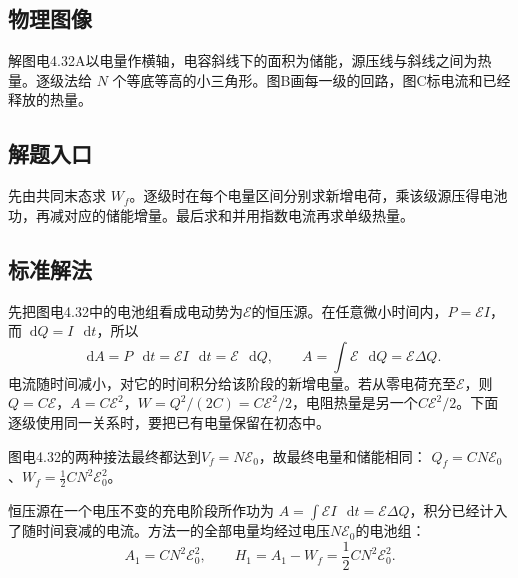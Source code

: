 \documentclass[UTF8,fontset=fandol,a4paper,11pt]{ctexart}
\newcommand{\dd}{\mathop{}\!\mathrm{d}}
\begin{document}
\subsection*{物理图像}

解图电4.32A以电量作横轴，电容斜线下的面积为储能，源压线与斜线之间为热量。逐级法给 $N$ 个等底等高的小三角形。图B画每一级的回路，图C标电流和已经释放的热量。



\subsection*{解题入口}

先由共同末态求 $W_f$。逐级时在每个电量区间分别求新增电荷，乘该级源压得电池功，再减对应的储能增量。最后求和并用指数电流再求单级热量。


\subsection*{标准解法}

先把图电4.32中的电池组看成电动势为$\mathcal E$的恒压源。在任意微小时间内，$P=\mathcal E I$，而$\dd Q=I\,\dd t$，所以
\[
\dd A=P\,\dd t=\mathcal E I\,\dd t=\mathcal E\,\dd Q,
\qquad A=\int\mathcal E\,\dd Q=\mathcal E\Delta Q.
\]
电流随时间减小，对它的时间积分给该阶段的新增电量。若从零电荷充至$\mathcal E$，则$Q=C\mathcal E$，$A=C\mathcal E^2$，$W=Q^2/(2C)=C\mathcal E^2/2$，电阻热量是另一个$C\mathcal E^2/2$。下面逐级使用同一关系时，要把已有电量保留在初态中。

图电4.32的两种接法最终都达到$V_f=N\mathcal E_0$，故最终电量和储能相同：
$Q_f=CN\mathcal E_0$、$W_f=\tfrac12CN^2\mathcal E_0^2$。

恒压源在一个电压不变的充电阶段所作功为
$A=\int\mathcal E I\,\dd t=\mathcal E\Delta Q$，积分已经计入了随时间衰减的电流。方法一的全部电量均经过电压$N\mathcal E_0$的电池组：
\[
A_1=CN^2\mathcal E_0^2,\qquad
\boxed{H_1=A_1-W_f=\frac12CN^2\mathcal E_0^2}.
\]
\end{document}
